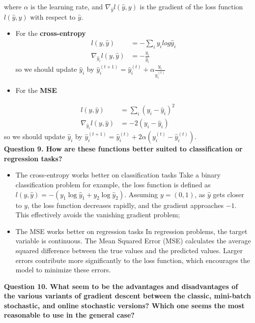 \documentclass{article}
\begin{document}
where \(\alpha\) is the learning rate, and \(\nabla_{\hat{y}} l(\hat{y}, y)\) is the gradient of the loss function \(l(\hat{y}, y)\) with respect to \(\hat{y}\).
\begin{itemize}
    \item For the \textbf{cross-entropy}\\
    \begin{align*}
        l(y,\hat{y})&=-\sum_{i}y_ilog\hat{y}_i\\
        \nabla_{\hat{y}_i}l(y,\hat{y})&=-\frac{y_i}{\hat{y}_i}
    \end{align*}
    so we should update \(\hat{y}_i\)  by \(\hat{y}_{i}^{(t+1)} = \hat{y}_{i}^{(t)} + \alpha \frac{y_i}{\hat{y}_i^{(t)}}\)
    \item For the \textbf{MSE}\\
    
    
\end{itemize}
\begin{align*}
    l(y,\hat{y})&=\sum_{i}(y_i-\hat{y}_i)^2\\
    \nabla_{\hat{y}_i}l(y,\hat{y})&=-2(y_i-\hat{y}_i)
\end{align*}
 so we should update  \(\hat{y}_i\)  by \(\hat{y}_{i}^{(t+1)} = \hat{y}_{i}^{(t)} + 2\alpha (y_i^{(t)}-\hat{y}_i^{(t)})\).\\

\noindent \textbf{Question 9. How are these functions better suited to classification or regression tasks?}

\begin{itemize}
    \item The cross-entropy works better on classification tasks
    Take a binary classification problem for example, the loss function is defined as \(l(y, \hat{y}) = -(y_1 \log \hat{y}_1 + y_2 \log \hat{y}_2)\). Assuming \(y = (0, 1)\), as \(\hat{y}\) gets closer to \(y\), the loss function decreases rapidly, and the gradient approaches \(-1\). This effectively avoids the vanishing gradient problem;
    \item The MSE works better on regression tasks
    In regression problems, the target variable is continuous. The Mean Squared Error (MSE) calculates the average squared difference between the true values and the predicted values. Larger errors contribute more significantly to the loss function, which encourages the model to minimize these errors. 
\end{itemize}

\noindent \textbf{Question 10. What seem to be the advantages and disadvantages of the various variants of gradient descent between the classic, mini-batch stochastic, and online stochastic versions? Which one seems the most reasonable to use in the general case?}
\end{document}

